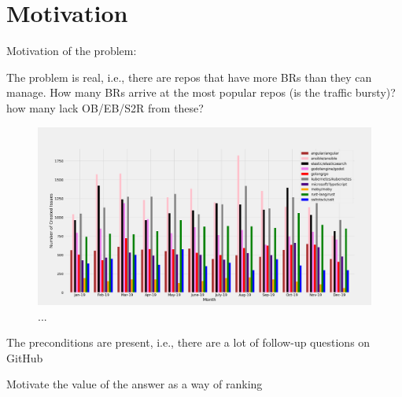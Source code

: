\section{Motivation}



Motivation of the problem:

The problem is real, i.e., there are repos that have more BRs than they can manage. How many BRs arrive at the most popular repos (is the traffic bursty)? how many lack OB/EB/S2R from these?

\begin{figure}[t]
\centering
\includegraphics[width=0.99\linewidth]{figures/repos_month_bar.png}
\caption{...}
\label{fig:repo_activity}
\end{figure}



The preconditions are present, i.e., there are a lot of follow-up questions on GitHub






Motivate the value of the answer as a way of ranking
